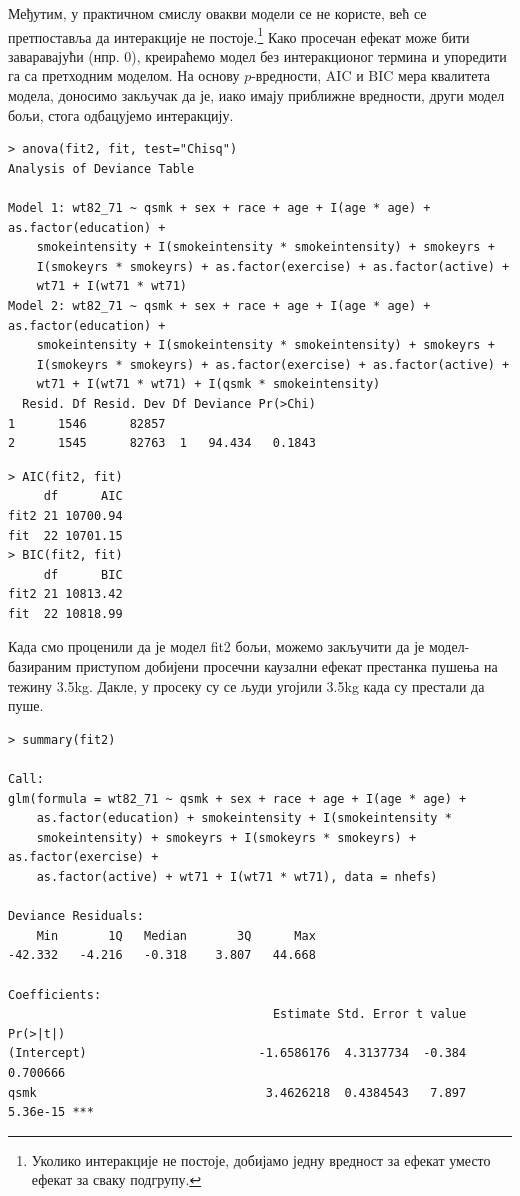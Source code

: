 \documentclass[12pt, a4paper]{article}
\begin{document}
Међутим, у практичном смислу овакви модели се не користе, већ се претпоставља да интеракције не постоје.\footnote{Уколико интеракције не постоје, добијамо једну вредност за ефекат уместо ефекат за сваку подгрупу.} Како просечан ефекат може бити заваравајући (нпр. $0$), креираћемо модел без интеракционог термина и упоредити га са претходним моделом. На основу $p$-вредности, $\text{AIC}$ и $\text{BIC}$ мера квалитета модела, доносимо закључак да је, иако имају приближне вредности, други модел бољи, стога одбацујемо интеракцију.

\begin{verbatim}
> anova(fit2, fit, test="Chisq")
Analysis of Deviance Table

Model 1: wt82_71 ~ qsmk + sex + race + age + I(age * age) + as.factor(education) + 
    smokeintensity + I(smokeintensity * smokeintensity) + smokeyrs + 
    I(smokeyrs * smokeyrs) + as.factor(exercise) + as.factor(active) + 
    wt71 + I(wt71 * wt71)
Model 2: wt82_71 ~ qsmk + sex + race + age + I(age * age) + as.factor(education) + 
    smokeintensity + I(smokeintensity * smokeintensity) + smokeyrs + 
    I(smokeyrs * smokeyrs) + as.factor(exercise) + as.factor(active) + 
    wt71 + I(wt71 * wt71) + I(qsmk * smokeintensity)
  Resid. Df Resid. Dev Df Deviance Pr(>Chi)
1      1546      82857                     
2      1545      82763  1   94.434   0.1843
\end{verbatim}

\begin{verbatim}
> AIC(fit2, fit)
     df      AIC
fit2 21 10700.94
fit  22 10701.15
> BIC(fit2, fit)
     df      BIC
fit2 21 10813.42
fit  22 10818.99
\end{verbatim}
Када смо проценили да је модел fit2 бољи, можемо закључити да је модел-базираним приступом добијени просечни каузални ефекат престанка пушења на тежину 3.5kg. Дакле, у просеку су се људи угојили 3.5kg када су престали да пуше.
\begin{lstlisting}
> summary(fit2)

Call:
glm(formula = wt82_71 ~ qsmk + sex + race + age + I(age * age) + 
    as.factor(education) + smokeintensity + I(smokeintensity * 
    smokeintensity) + smokeyrs + I(smokeyrs * smokeyrs) + as.factor(exercise) + 
    as.factor(active) + wt71 + I(wt71 * wt71), data = nhefs)

Deviance Residuals: 
    Min       1Q   Median       3Q      Max  
-42.332   -4.216   -0.318    3.807   44.668  

Coefficients:
                                     Estimate Std. Error t value Pr(>|t|)    
(Intercept)                        -1.6586176  4.3137734  -0.384 0.700666    
qsmk                                3.4626218  0.4384543   7.897 5.36e-15 ***
\end{lstlisting}
\end{document}
